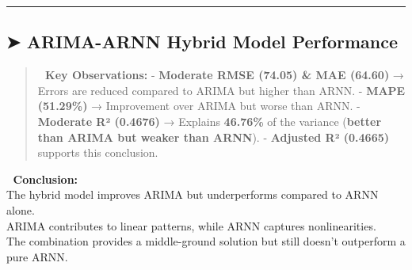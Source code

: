 \documentclass[11pt]{article}
\begin{document}
\begin{center}\rule{0.5\linewidth}{0.5pt}\end{center}

\hypertarget{arima-arnn-hybrid-model-performance}{%
\subsection{\texorpdfstring{\textbf{➤ ARIMA-ARNN Hybrid Model
Performance}}{➤ ARIMA-ARNN Hybrid Model Performance}}\label{arima-arnn-hybrid-model-performance}}

\begin{quote}
\textbf{🔹 Key Observations:} - \textbf{Moderate RMSE (74.05) \& MAE
(64.60)} → Errors are reduced compared to ARIMA but higher than ARNN. -
\textbf{MAPE (51.29\%)} → Improvement over ARIMA but worse than ARNN. -
\textbf{Moderate R² (0.4676)} → Explains \textbf{46.76\%} of the
variance (\textbf{better than ARIMA but weaker than ARNN}). -
\textbf{Adjusted R² (0.4665)} supports this conclusion.
\end{quote}

📌 \textbf{Conclusion:}\\
\hspace*{0.333em}\hspace*{0.333em}\hspace*{0.333em}\hspace*{0.333em}The
hybrid model improves ARIMA but underperforms compared to ARNN alone.\\
\hspace*{0.333em}\hspace*{0.333em}\hspace*{0.333em}\hspace*{0.333em}ARIMA
contributes to linear patterns, while ARNN captures nonlinearities.\\
\hspace*{0.333em}\hspace*{0.333em}\hspace*{0.333em}\hspace*{0.333em}The
combination provides a middle-ground solution but still doesn't
outperform a pure ARNN.
\end{document}
